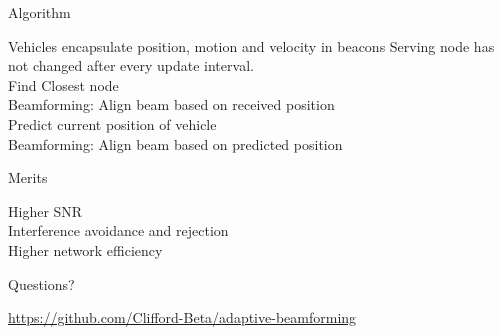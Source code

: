 \documentclass[10pt]{beamer}
\begin{document}
\begin{frame}{Algorithm}
\begin{algorithmic}
\Require Vehicles encapsulate position, motion and velocity in beacons
\Ensure Serving node has not changed after every update interval.
\\Find Closest node 
 \\Beamforming: Align beam based on received position
\Else
\\Predict current position of vehicle \\
 Beamforming: Align beam based on predicted position
 \EndIf
\EndIf
\end{algorithmic}
\end{frame}

\begin{frame}{Merits}
	\begin{description}
		\item [Higher SNR] 
		\item [Interference avoidance and rejection] 
		\item [Higher network efficiency] 
	\end{description}
\end{frame}

{
\begin{frame}[standout]
  Questions?
\end{frame}
}

\begin{frame}[standout]
  \url{https://github.com/Clifford-Beta/adaptive-beamforming}
\end{frame}
\end{document}
